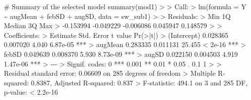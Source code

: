 \documentclass[
  letterpaper,
]{book}
\newenvironment{Shaded}{\begin{snugshade}}{\end{snugshade}}
\newcommand{\AttributeTok}[1]{\textcolor[rgb]{0.40,0.45,0.13}{#1}}
\newcommand{\CommentTok}[1]{\textcolor[rgb]{0.37,0.37,0.37}{#1}}
\newcommand{\DecValTok}[1]{\textcolor[rgb]{0.68,0.00,0.00}{#1}}
\newcommand{\ErrorTok}[1]{\textcolor[rgb]{0.68,0.00,0.00}{#1}}
\newcommand{\FloatTok}[1]{\textcolor[rgb]{0.68,0.00,0.00}{#1}}
\newcommand{\FunctionTok}[1]{\textcolor[rgb]{0.28,0.35,0.67}{#1}}
\newcommand{\NormalTok}[1]{\textcolor[rgb]{0.00,0.23,0.31}{#1}}
\newcommand{\SpecialCharTok}[1]{\textcolor[rgb]{0.37,0.37,0.37}{#1}}
\newcommand{\StringTok}[1]{\textcolor[rgb]{0.13,0.47,0.30}{#1}}
\begin{document}
\begin{Shaded}
\begin{Highlighting}[]
\CommentTok{\# Summary of the selected model}
\FunctionTok{summary}\NormalTok{(mod1)}
\SpecialCharTok{\textgreater{}} 
\ErrorTok{\textgreater{}}\NormalTok{ Call}\SpecialCharTok{:}
\ErrorTok{\textgreater{}} \FunctionTok{lm}\NormalTok{(}\AttributeTok{formula =}\NormalTok{ Y }\SpecialCharTok{\textasciitilde{}}\NormalTok{ augMean }\SpecialCharTok{+}\NormalTok{ febSD }\SpecialCharTok{+}\NormalTok{ augSD, }\AttributeTok{data =}\NormalTok{ sw\_sub1)}
\SpecialCharTok{\textgreater{}} 
\ErrorTok{\textgreater{}}\NormalTok{ Residuals}\SpecialCharTok{:}
\ErrorTok{\textgreater{}}\NormalTok{       Min        }\DecValTok{1}\NormalTok{Q    Median        }\DecValTok{3}\NormalTok{Q       Max }
\SpecialCharTok{\textgreater{}} \SpecialCharTok{{-}}\FloatTok{0.153994} \SpecialCharTok{{-}}\FloatTok{0.049229} \SpecialCharTok{{-}}\FloatTok{0.006086}  \FloatTok{0.045947}  \FloatTok{0.148579} 
\SpecialCharTok{\textgreater{}} 
\ErrorTok{\textgreater{}}\NormalTok{ Coefficients}\SpecialCharTok{:}
\ErrorTok{\textgreater{}}\NormalTok{             Estimate Std. Error t value }\FunctionTok{Pr}\NormalTok{(}\SpecialCharTok{\textgreater{}}\ErrorTok{|}\NormalTok{t}\SpecialCharTok{|}\NormalTok{)    }
\SpecialCharTok{\textgreater{}}\NormalTok{ (Intercept) }\FloatTok{0.028365}   \FloatTok{0.007020}   \FloatTok{4.040} \FloatTok{6.87e{-}05} \SpecialCharTok{**}\ErrorTok{*}
\ErrorTok{\textgreater{}}\NormalTok{ augMean     }\FloatTok{0.283335}   \FloatTok{0.011131}  \FloatTok{25.455}  \SpecialCharTok{\textless{}} \FloatTok{2e{-}16} \SpecialCharTok{**}\ErrorTok{*}
\ErrorTok{\textgreater{}}\NormalTok{ febSD       }\FloatTok{0.049639}   \FloatTok{0.008370}   \FloatTok{5.930} \FloatTok{8.73e{-}09} \SpecialCharTok{**}\ErrorTok{*}
\ErrorTok{\textgreater{}}\NormalTok{ augSD       }\FloatTok{0.022150}   \FloatTok{0.004503}   \FloatTok{4.919} \FloatTok{1.47e{-}06} \SpecialCharTok{**}\ErrorTok{*}
\ErrorTok{\textgreater{}} \SpecialCharTok{{-}{-}{-}}
\ErrorTok{\textgreater{}}\NormalTok{ Signif. codes}\SpecialCharTok{:}  \DecValTok{0} \StringTok{\textquotesingle{}***\textquotesingle{}} \FloatTok{0.001} \StringTok{\textquotesingle{}**\textquotesingle{}} \FloatTok{0.01} \StringTok{\textquotesingle{}*\textquotesingle{}} \FloatTok{0.05} \StringTok{\textquotesingle{}.\textquotesingle{}} \FloatTok{0.1} \StringTok{\textquotesingle{} \textquotesingle{}} \DecValTok{1}
\SpecialCharTok{\textgreater{}} 
\ErrorTok{\textgreater{}}\NormalTok{ Residual standard error}\SpecialCharTok{:} \FloatTok{0.06609}\NormalTok{ on }\DecValTok{285}\NormalTok{ degrees of freedom}
\SpecialCharTok{\textgreater{}}\NormalTok{ Multiple R}\SpecialCharTok{{-}}\NormalTok{squared}\SpecialCharTok{:}  \FloatTok{0.8387}\NormalTok{,  Adjusted R}\SpecialCharTok{{-}}\NormalTok{squared}\SpecialCharTok{:}  \FloatTok{0.837} 
\SpecialCharTok{\textgreater{}}\NormalTok{ F}\SpecialCharTok{{-}}\NormalTok{statistic}\SpecialCharTok{:} \FloatTok{494.1}\NormalTok{ on }\DecValTok{3}\NormalTok{ and }\DecValTok{285}\NormalTok{ DF,  p}\SpecialCharTok{{-}}\NormalTok{value}\SpecialCharTok{:} \ErrorTok{\textless{}} \FloatTok{2.2e{-}16}
\end{Highlighting}
\end{Shaded}
\end{document}
